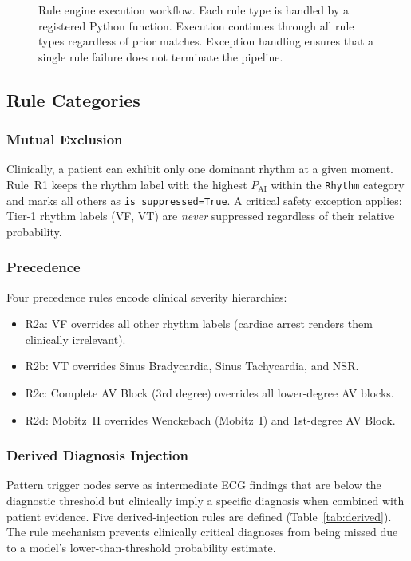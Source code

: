 \documentclass[journal]{IEEEtran}
\begin{document}
\begin{figure}[!t]
\begin{tikzpicture}[node distance=0.40cm]

\end{tikzpicture}
\caption{Rule engine execution workflow. Each rule type is handled
by a registered Python function. Execution continues through all
rule types regardless of prior matches. Exception handling ensures
that a single rule failure does not terminate the pipeline.}
\label{fig:rules}
\end{figure}

\subsection{Rule Categories}

\subsubsection{Mutual Exclusion}
Clinically, a patient can exhibit only one dominant rhythm at a
given moment.
Rule~R1 keeps the rhythm label with the highest $P_{\text{AI}}$
within the \texttt{Rhythm} category and marks all others as
\texttt{is\_suppressed=True}.
A critical safety exception applies: Tier-1 rhythm labels (VF, VT)
are \emph{never} suppressed regardless of their relative probability.

\subsubsection{Precedence}
Four precedence rules encode clinical severity hierarchies:
\begin{itemize}
  \item R2a: VF overrides all other rhythm labels (cardiac arrest
        renders them clinically irrelevant).
  \item R2b: VT overrides Sinus Bradycardia, Sinus Tachycardia,
        and NSR.
  \item R2c: Complete AV Block (3rd degree) overrides all lower-degree
        AV blocks.
  \item R2d: Mobitz~II overrides Wenckebach (Mobitz~I) and
        1st-degree AV Block.
\end{itemize}

\subsubsection{Derived Diagnosis Injection}
\label{sec:derived}
Pattern trigger nodes serve as intermediate ECG findings that are
below the diagnostic threshold but clinically imply a specific
diagnosis when combined with patient evidence.
Five derived-injection rules are defined (Table~\ref{tab:derived}).
The rule mechanism prevents clinically critical diagnoses from being
missed due to a model's lower-than-threshold probability estimate.
\end{document}
